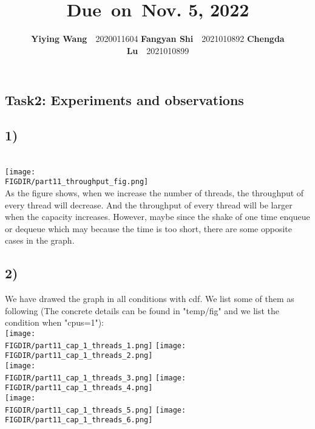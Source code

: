 \documentclass{article}
\title{\textmd{\bf \Class}\\\normalsize\vspace{0.1in}\small{Due\ on\ Nov. 5, 2022}}
\date{}
\author{\textbf{Yiying Wang}\ \ 2020011604 \textbf{Fangyan Shi}\ \ 2021010892  \textbf{Chengda Lu}\ \ 2021010899}
\newcommand{\FIGDIR}{} %
\begin{document}
\begin{spacing}{1.1}
\maketitle \thispagestyle{empty}
\section*{Task2: Experiments and observations}
\subsection*{1)}
\\\texttt{[image: \\FIGDIR/part11\_throughput\_fig.png]}
\\\indent As the figure shows, when we increase the number of threads, the throughput of every thread will decrease. And the throughput of every thread  will be larger when the capacity increases. However, maybe since the shake of one time enqueue or dequeue which may because the time is too short, there are some opposite cases in the graph.

\subsection*{2)}
\indent We have drawed the graph in all conditions with cdf. We list some of them as following (The concrete details can be found in "temp/fig" and we list the condition when "cpus=1"):
\\\texttt{[image: \\FIGDIR/part11\_cap\_1\_threads\_1.png]}
\texttt{[image: \\FIGDIR/part11\_cap\_1\_threads\_2.png]}
\newpage
\\\texttt{[image: \\FIGDIR/part11\_cap\_1\_threads\_3.png]}
\texttt{[image: \\FIGDIR/part11\_cap\_1\_threads\_4.png]}
\\\texttt{[image: \\FIGDIR/part11\_cap\_1\_threads\_5.png]}
\texttt{[image: \\FIGDIR/part11\_cap\_1\_threads\_6.png]}


\end{spacing}
\end{document}
